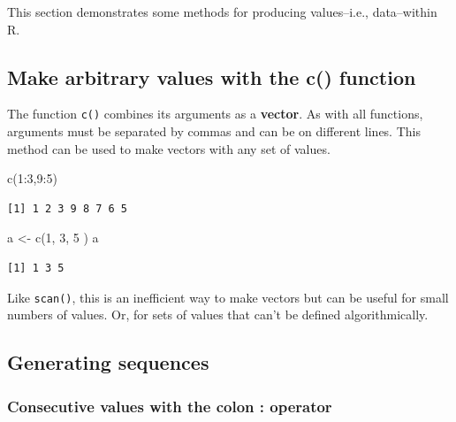 \documentclass[
  13,
  letterpaper,
]{report}
\newenvironment{Shaded}{\begin{snugshade}}{\end{snugshade}}
\newcommand{\DecValTok}[1]{\textcolor[rgb]{0.68,0.00,0.00}{#1}}
\newcommand{\FunctionTok}[1]{\textcolor[rgb]{0.28,0.35,0.67}{#1}}
\newcommand{\NormalTok}[1]{\textcolor[rgb]{0.00,0.23,0.31}{#1}}
\newcommand{\OtherTok}[1]{\textcolor[rgb]{0.00,0.23,0.31}{#1}}
\newcommand{\SpecialCharTok}[1]{\textcolor[rgb]{0.37,0.37,0.37}{#1}}
\begin{document}
This section demonstrates some methods for producing values--i.e.,
data--within R.

\subsection{Make arbitrary values with the c()
function}\label{sec-manip-make-c}

The function \texttt{c()} combines its arguments as a \textbf{vector}.
As with all functions, arguments must be separated by commas and can be
on different lines. This method can be used to make vectors with any set
of values.

\begin{Shaded}
\begin{Highlighting}[]
\FunctionTok{c}\NormalTok{(}\DecValTok{1}\SpecialCharTok{:}\DecValTok{3}\NormalTok{,}\DecValTok{9}\SpecialCharTok{:}\DecValTok{5}\NormalTok{)}
\end{Highlighting}
\end{Shaded}

\begin{verbatim}
[1] 1 2 3 9 8 7 6 5
\end{verbatim}

\begin{Shaded}
\begin{Highlighting}[]
\NormalTok{a }\OtherTok{\textless{}{-}} \FunctionTok{c}\NormalTok{(}\DecValTok{1}\NormalTok{,}
      \DecValTok{3}\NormalTok{,}
       \DecValTok{5}
\NormalTok{       )}
\NormalTok{a}
\end{Highlighting}
\end{Shaded}

\begin{verbatim}
[1] 1 3 5
\end{verbatim}

Like \texttt{scan()}, this is an inefficient way to make vectors but can
be useful for small numbers of values. Or, for sets of values that can't
be defined algorithmically.

\subsection{Generating sequences}\label{sec-manip-make-seq}

\subsubsection{Consecutive values with the colon :
operator}\label{sec-manip-make-seq-col}
\end{document}
